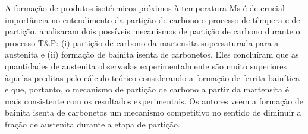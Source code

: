 A formação de produtos isotérmicos próximos à temperatura Ms é de crucial importância no entendimento da partição de carbono o processo de têmpera e de partição.  analisaram dois possíveis mecanismos de partição de carbono durante o processo T\&P: (i) partição de carbono da martensita supersaturada para a austenita e (ii) formação de bainita isenta de carbonetos. Eles concluíram que as quantidades de austenita observadas experimentalmente são muito superiores àquelas preditas pelo cálculo teórico considerando a formação de ferrita bainítica e que, portanto, o mecanismo de partição de carbono a partir da martensita é mais consistente com os resultados experimentais. Os autores veem a formação de bainita isenta de carbonetos um mecanismo competitivo no sentido de diminuir a fração de austenita durante a etapa de partição.


